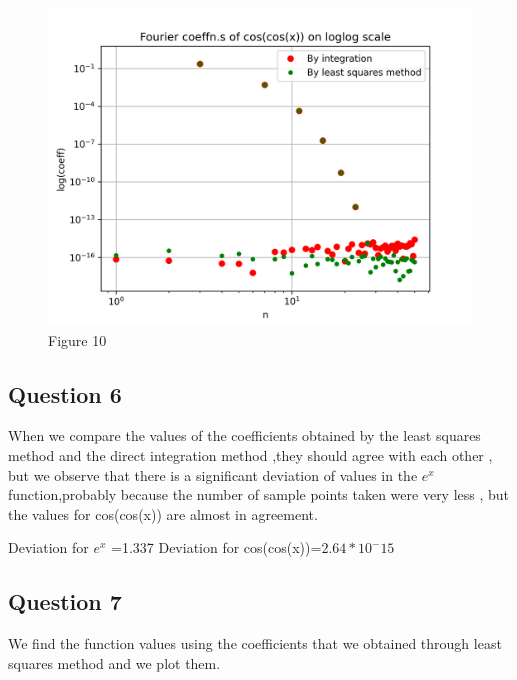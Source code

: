 \documentclass[11pt, a4paper]{article}
\begin{document}
\begin{figure}[!tbh]
\centering
\includegraphics[scale=0.6]{assn4_plot10.png}
\caption{Figure 10}
\label{fig:plot10}
\end{figure} 

\subsection*{Question 6}

When we compare the values of the coefficients obtained by the least squares method and the direct integration method ,they should agree with each other , but we observe that there is a significant deviation of values in the $e^x$ function,probably because the number of sample points taken were very less , but the values for cos(cos(x)) are almost in agreement.

Deviation for $e^x$ =1.337
Deviation for cos(cos(x))=$2.64*10^-15$

\subsection*{Question 7}
We find the function values using the coefficients that we obtained through least squares method and we plot them.
\end{document}

